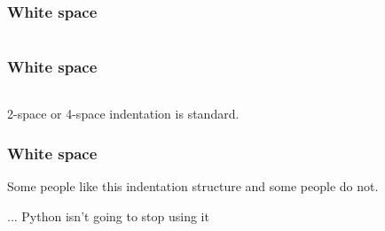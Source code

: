 \documentclass{beamer}
\begin{document}
\begin{frame}
\frametitle{White space}

\begin{center}
\begin{tabular}{c}

\end{tabular}
\end{center}

\end{frame}


\begin{frame}
\frametitle{White space}

\begin{center}
\begin{tabular}{c}

\end{tabular}
\end{center}

2-space or 4-space indentation is standard.

\end{frame}

\begin{frame}
\frametitle{White space}

Some people like this indentation structure and some people do not.

\vspace{0.2in}

... Python isn't going to stop using it


\end{frame}
\end{document}
